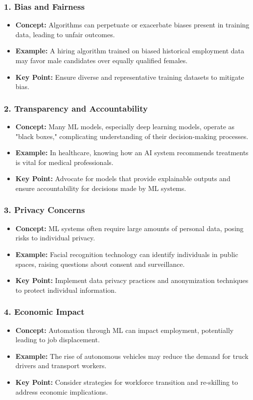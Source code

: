 \documentclass[aspectratio=169]{beamer}
\begin{document}
\begin{frame}[fragile]
    \frametitle{1. Bias and Fairness}
    \begin{itemize}
        \item \textbf{Concept:} Algorithms can perpetuate or exacerbate biases present in training data, leading to unfair outcomes.
        \item \textbf{Example:} A hiring algorithm trained on biased historical employment data may favor male candidates over equally qualified females.
        \item \textbf{Key Point:} Ensure diverse and representative training datasets to mitigate bias.
    \end{itemize}
\end{frame}

\begin{frame}[fragile]
    \frametitle{2. Transparency and Accountability}
    \begin{itemize}
        \item \textbf{Concept:} Many ML models, especially deep learning models, operate as "black boxes," complicating understanding of their decision-making processes.
        \item \textbf{Example:} In healthcare, knowing how an AI system recommends treatments is vital for medical professionals.
        \item \textbf{Key Point:} Advocate for models that provide explainable outputs and ensure accountability for decisions made by ML systems.
    \end{itemize}
\end{frame}

\begin{frame}[fragile]
    \frametitle{3. Privacy Concerns}
    \begin{itemize}
        \item \textbf{Concept:} ML systems often require large amounts of personal data, posing risks to individual privacy.
        \item \textbf{Example:} Facial recognition technology can identify individuals in public spaces, raising questions about consent and surveillance.
        \item \textbf{Key Point:} Implement data privacy practices and anonymization techniques to protect individual information.
    \end{itemize}
\end{frame}

\begin{frame}[fragile]
    \frametitle{4. Economic Impact}
    \begin{itemize}
        \item \textbf{Concept:} Automation through ML can impact employment, potentially leading to job displacement.
        \item \textbf{Example:} The rise of autonomous vehicles may reduce the demand for truck drivers and transport workers.
        \item \textbf{Key Point:} Consider strategies for workforce transition and re-skilling to address economic implications.
    \end{itemize}
\end{frame}
\end{document}
